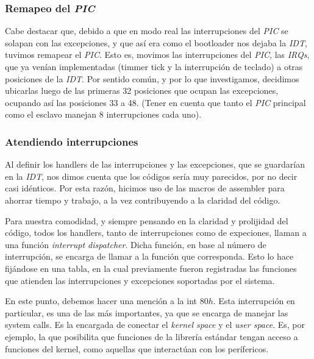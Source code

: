 \documentclass[a4paper,10pt]{article}
\begin{document}
        \subsubsection{Remapeo del \textit{PIC}}
            Cabe destacar que, debido a que en modo real las interrupciones del \textit{PIC} se solapan con las excepciones, y que así era como el bootloader
            nos dejaba la \textit{IDT}, tuvimos remapear el \textit{PIC}. Esto es, movimos las interrupciones del \textit{PIC}, las \textit{IRQs}, que ya venían implementadas 
            (timmer tick y la interrupción de teclado) a otras posiciones de la \textit{IDT}. Por sentido común, y por lo que investigamos, decidimos
            ubicarlas luego de las primeras 32 posiciones que ocupan las excepciones, ocupando así las posiciones 33 a 48. (Tener en cuenta
            que tanto el \textit{PIC} principal como el esclavo manejan 8 interrupciones cada uno).
        
        \subsubsection{Atendiendo interrupciones}
            Al definir los handlers de las interrupciones y las excepciones, que se guardarían en la \textit{IDT}, nos dimos cuenta que los códigos sería muy parecidos,
            por no decir casi idénticos. Por esta razón, hicimos uso de las macros de assembler para ahorrar tiempo y trabajo, a la vez
            contribuyendo a la claridad del código.
            
            Para nuestra comodidad, y siempre pensando en la claridad y prolijidad del código, todos los handlers, tanto de interrupciones
            como de expeciones, llaman a una función \textit{interrupt dispatcher}. Dicha función, en base al número de interrupción, se encarga de llamar
	    a la función que corresponda. Esto lo hace fijándose en una tabla, en la cual previamente fueron registradas las funciones que atienden
	    las interrupciones y excepciones soportadas por el sistema.
	    
	    En este punto, debemos hacer una mención a la int $80h$. Esta interrupción en particular, es una de las más importantes, ya que se encarga de manejar las
	    system calls. Es la encargada de conectar el \textit{kernel space} y el \textit{user space}. Es, por ejemplo, la que posibilita que funciones de la librería
	    estándar tengan acceso a funciones del kernel, como aquellas que interactúan con los perífericos. 
	   
\end{document}
